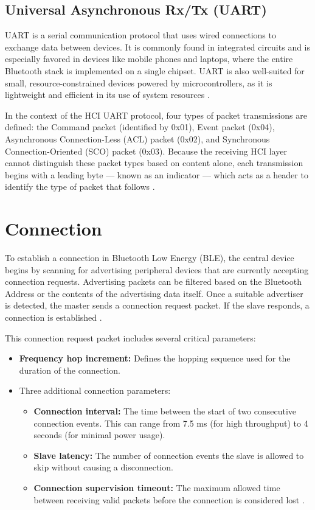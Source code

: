 \subsection{Universal Asynchronous Rx/Tx (UART)}

UART is a serial communication protocol that uses wired connections to exchange data between devices. It is commonly found in integrated circuits and is especially favored in devices like mobile phones and laptops, where the entire Bluetooth stack is implemented on a single chipset. UART is also well-suited for small, resource-constrained devices powered by microcontrollers, as it is lightweight and efficient in its use of system resources \cite{nextgenBLE}.

In the context of the HCI UART protocol, four types of packet transmissions are defined: the Command packet (identified by 0x01), Event packet (0x04), Asynchronous Connection-Less (ACL) packet (0x02), and Synchronous Connection-Oriented (SCO) packet (0x03). Because the receiving HCI layer cannot distinguish these packet types based on content alone, each transmission begins with a leading byte — known as an indicator — which acts as a header to identify the type of packet that follows \cite{nextgenBLE}.

\section{Connection}

To establish a connection in Bluetooth Low Energy (BLE), the central device begins by scanning for advertising peripheral devices that are currently accepting connection requests. Advertising packets can be filtered based on the Bluetooth Address or the contents of the advertising data itself. Once a suitable advertiser is detected, the master sends a connection request packet. If the slave responds, a connection is established \cite{gettingstartedwble}.

This connection request packet includes several critical parameters:
\begin{itemize}
    \item \textbf{Frequency hop increment:} Defines the hopping sequence used for the duration of the connection.
    \item Three additional connection parameters:
    \begin{itemize}
        \item \textbf{Connection interval:} The time between the start of two consecutive connection events. This can range from 7.5 ms (for high throughput) to 4 seconds (for minimal power usage).
        \item \textbf{Slave latency:} The number of connection events the slave is allowed to skip without causing a disconnection.
        \item \textbf{Connection supervision timeout:} The maximum allowed time between receiving valid packets before the connection is considered lost \cite{gettingstartedwble}.
    \end{itemize}
\end{itemize}

